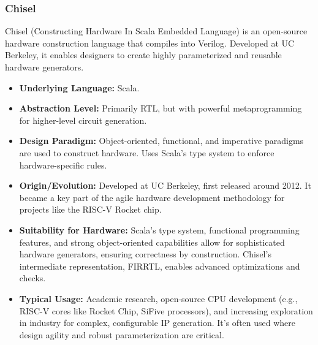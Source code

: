 \documentclass[sigconf, anonymous=false]{acmart} %
\begin{document}
\subsubsection{Chisel}
Chisel (Constructing Hardware In Scala Embedded Language) is an open-source hardware construction language that compiles into Verilog. Developed at UC Berkeley, it enables designers to create highly parameterized and reusable hardware generators.
\begin{itemize}
    \item \textbf{Underlying Language:} Scala.
    \item \textbf{Abstraction Level:} Primarily RTL, but with powerful metaprogramming for higher-level circuit generation.
    \item \textbf{Design Paradigm:} Object-oriented, functional, and imperative paradigms are used to construct hardware. Uses Scala's type system to enforce hardware-specific rules.
    \item \textbf{Origin/Evolution:} Developed at UC Berkeley, first released around 2012. It became a key part of the agile hardware development methodology for projects like the RISC-V Rocket chip.
    \item \textbf{Suitability for Hardware:} Scala's type system, functional programming features, and strong object-oriented capabilities allow for sophisticated hardware generators, ensuring correctness by construction. Chisel's intermediate representation, FIRRTL, enables advanced optimizations and checks.
    \item \textbf{Typical Usage:} Academic research, open-source CPU development (e.g., RISC-V cores like Rocket Chip, SiFive processors), and increasing exploration in industry for complex, configurable IP generation. It's often used where design agility and robust parameterization are critical.
\end{itemize}
\end{document}

